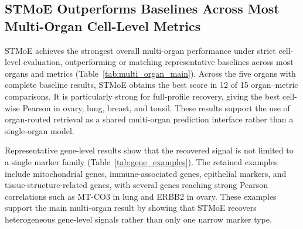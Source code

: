 \documentclass[sigconf]{acmart}
\newcommand{\method}{STMoE\xspace}
\begin{document}
\subsection{\method{} Outperforms Baselines Across Most Multi-Organ Cell-Level Metrics}

\method{} achieves the strongest overall multi-organ performance under strict cell-level evaluation, outperforming or matching representative baselines across most organs and metrics (Table~\ref{tab:multi_organ_main}). Across the five organs with complete baseline results, \method{} obtains the best score in 12 of 15 organ--metric comparisons. It is particularly strong for full-profile recovery, giving the best cell-wise Pearson in ovary, lung, breast, and tonsil. These results support the use of organ-routed retrieval as a shared multi-organ prediction interface rather than a single-organ model.

Representative gene-level results show that the recovered signal is not limited to a single marker family (Table~\ref{tab:gene_examples}). The retained examples include mitochondrial genes, immune-associated genes, epithelial markers, and tissue-structure-related genes, with several genes reaching strong Pearson correlations such as MT-CO3 in lung and ERBB2 in ovary. These examples support the main multi-organ result by showing that \method{} recovers heterogeneous gene-level signals rather than only one narrow marker type.
\end{document}
